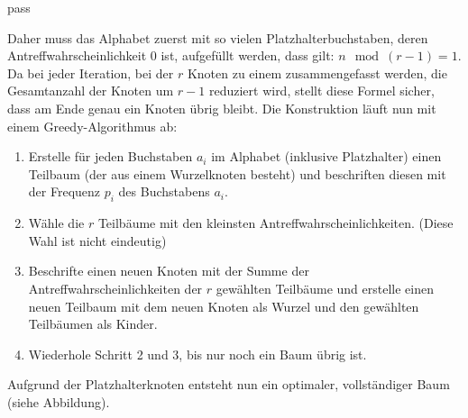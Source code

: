 pass\documentclass[a4paper,10pt,ngerman]{scrartcl}
\begin{document}
    Daher muss das Alphabet zuerst mit so vielen Platzhalterbuchstaben, deren Antreffwahrscheinlichkeit 0 ist, aufgefüllt werden, dass gilt: $n \mod (r - 1) = 1$.
    Da bei jeder Iteration, bei der $r$ Knoten zu einem zusammengefasst werden, die Gesamtanzahl der Knoten um $r-1$ reduziert wird, stellt diese Formel sicher, dass am Ende genau ein Knoten übrig bleibt.
    Die Konstruktion läuft nun mit einem Greedy-Algorithmus ab:
    \begin{enumerate}
        \item Erstelle für jeden Buchstaben $a_i$ im Alphabet (inklusive Platzhalter) einen Teilbaum (der aus einem Wurzelknoten besteht) und beschriften diesen mit der Frequenz $p_i$ des Buchstabens $a_i$.
        \item Wähle die $r$ Teilbäume mit den kleinsten Antreffwahrscheinlichkeiten. (Diese Wahl ist nicht eindeutig)
        \item Beschrifte einen neuen Knoten mit der Summe der Antreffwahrscheinlichkeiten der $r$ gewählten Teilbäume und erstelle einen neuen Teilbaum mit dem neuen Knoten als Wurzel und den gewählten Teilbäumen als Kinder.
        \item Wiederhole Schritt 2 und 3, bis nur noch ein Baum übrig ist.
    \end{enumerate}
    Aufgrund der Platzhalterknoten entsteht nun ein optimaler, vollständiger Baum (siehe Abbildung).
\end{document}
